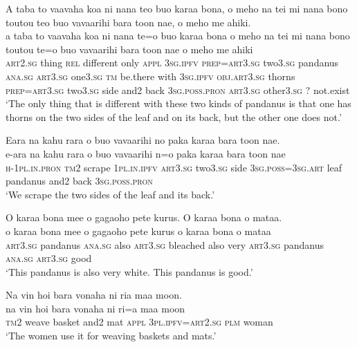 \newpage
\ea\label{ex:text9-12}
A taba to vaavaha koa ni nana teo buo karaa bona, o meho na tei mi nana bono toutou teo buo vavaarihi bara toon nae, o meho me ahiki.\\
\gll a	taba	to	vaavaha	koa	ni	nana	te=o	buo	karaa	bona	o	meho	na	tei	mi	nana	bono	toutou	te=o	buo	vavaarihi	bara	toon	nae	o	meho	me	ahiki\\
     \textsc{art}2.\textsc{sg}	thing	\textsc{rel}	different	only	\textsc{appl}	3\textsc{sg}.\textsc{ipfv}	\textsc{prep}=\textsc{art}3.\textsc{sg}	two3.\textsc{sg}	pandanus	\textsc{ana}.\textsc{sg}	\textsc{art}3.\textsc{sg}	one3.\textsc{sg}	\textsc{tm}	be.there	with	3\textsc{sg}.\textsc{ipfv}	\textsc{obj}.\textsc{art}3.\textsc{sg}	thorns	\textsc{prep}=\textsc{art}3.\textsc{sg}	two3.\textsc{sg}	side	and2	back	3\textsc{sg}.\textsc{poss}.\textsc{pron}	\textsc{art}3.\textsc{sg}	other3.\textsc{sg}	?	not.exist\\
\glt `The only thing that is different with these two kinds of pandanus is that one has thorns on the two sides of the leaf and on its back, but the other one does not.'
\z

\ea\label{ex:text9-13}
Eara na kahu rara o buo vavaarihi no paka karaa bara toon nae.\\
\gll e-ara	na	kahu	rara	o	buo	vavaarihi	n=o	paka	karaa	bara	toon	nae\\
     \textsc{h}-1\textsc{pl}.\textsc{in}.\textsc{pron}	\textsc{tm}2	scrape	1\textsc{pl}.\textsc{in}.\textsc{ipfv}	\textsc{art}3.\textsc{sg}	two3.\textsc{sg}	side	3\textsc{sg}.\textsc{poss}=3\textsc{sg}.\textsc{art}	leaf	pandanus	and2	back	3\textsc{sg}.\textsc{poss}.\textsc{pron}\\
\glt `We scrape the two sides of the leaf and its back.'
\z

\ea\label{ex:text9-14}
O karaa bona mee o gagaoho pete kurus. O karaa bona o mataa.\\
\gll o	karaa	bona	mee	o	gagaoho	pete	kurus	o	karaa	bona	o	mataa\\
     \textsc{art}3.\textsc{sg}	pandanus	\textsc{ana}.\textsc{sg}	also	\textsc{art}3.\textsc{sg}	bleached	also	very	\textsc{art}3.\textsc{sg}	pandanus	\textsc{ana}.\textsc{sg}	\textsc{art}3.\textsc{sg}	good\\
\glt `This pandanus is also very white. This pandanus is good.'
\z

\ea\label{ex:text9-15}
Na vin hoi bara vonaha ni ria maa moon.\\
\gll na	vin	hoi	bara	vonaha	ni	ri=a	maa	moon\\
     \textsc{tm}2	weave	basket	and2	mat	\textsc{appl}	3\textsc{pl}.\textsc{ipfv}=\textsc{art}2.\textsc{sg}	\textsc{plm}	woman\\
\glt `The women use it for weaving baskets and mats.'
\z

